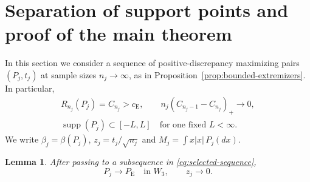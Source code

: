 \documentclass[aop]{imsart}
\theoremstyle{plain}
\newtheorem{lemma}[theorem]{Lemma}
\theoremstyle{definition}
\theoremstyle{definition}
\newcommand{\ce}{c_{\mathrm E}}
\newcommand{\Pe}{P_{\mathrm E}}
\DeclareMathOperator{\supp}{supp}
\begin{document}
\section{Separation of support points and proof of the main theorem}\label{sec:completion}

In this section we consider a sequence of positive-discrepancy maximizing pairs \((P_j,t_j)\) at sample sizes \(n_j\to\infty\), as in Proposition~\ref{prop:bounded-extremizers}. In particular,
\begin{equation}\label{eq:selected-sequence}
\begin{gathered}
 R_{n_j}(P_j)=C_{n_j}>\ce,\qquad
 n_j(C_{n_j-1}-C_{n_j})_+\longrightarrow0,\\
 \supp(P_j)\subset[-L,L]
 \quad\text{for one fixed }L<\infty.
\end{gathered}
\end{equation}
We write \(\beta_j=\beta(P_j)\), \(z_j=t_j/\sqrt{n_j}\) and
\(M_j=\int x|x|\,P_j(dx)\).

\begin{lemma}\label{lem:limit-extremizer}
After passing to a subsequence in \eqref{eq:selected-sequence},
\[
 P_j\longrightarrow\Pe\quad\text{in }W_3,
 \qquad z_j\longrightarrow0.
\]
\end{lemma}
\end{document}
